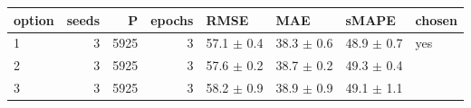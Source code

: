 \begin{tabular}{lrrrllll}
\toprule
option & seeds & P & epochs & RMSE & MAE & sMAPE & chosen \\
\midrule
1 & 3 & 5925 & 3 & 57.1 $\pm$ 0.4 & 38.3 $\pm$ 0.6 & 48.9 $\pm$ 0.7 & yes \\
2 & 3 & 5925 & 3 & 57.6 $\pm$ 0.2 & 38.7 $\pm$ 0.2 & 49.3 $\pm$ 0.4 &  \\
3 & 3 & 5925 & 3 & 58.2 $\pm$ 0.9 & 38.9 $\pm$ 0.9 & 49.1 $\pm$ 1.1 &  \\
\bottomrule
\end{tabular}
